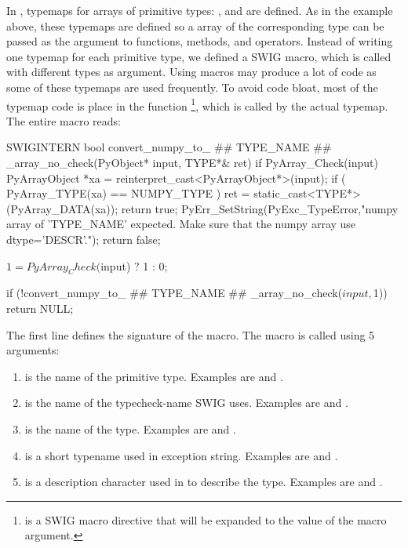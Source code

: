In , typemaps for arrays of primitive types:
,  and  are defined. 
As in the  example above, these typemaps are defined so a \numpy
array of the corresponding type can be passed as the argument to functions,
methods, and operators. 
Instead of writing one typemap for each primitive type, we defined a SWIG
macro, which is called with different types as argument. Using macros may
produce a lot of code as some of these typemaps are used frequently. To
avoid code bloat, most of the typemap code is place in the function
\-\-\footnote{ is a SWIG macro directive that will be expanded to the value of the  macro argument.}, which is called
by the actual typemap. The entire macro reads:
\begin{swigcode}
SWIGINTERN bool convert_numpy_to_ ## TYPE_NAME ## _array_no_check(PyObject* input, TYPE*& ret)
{
  if PyArray_Check(input)
  {
    PyArrayObject *xa = reinterpret_cast<PyArrayObject*>(input);
    if ( PyArray_TYPE(xa) == NUMPY_TYPE )
    {
      ret  = static_cast<TYPE*>(PyArray_DATA(xa));
      return true;
    }
  }
  PyErr_SetString(PyExc_TypeError,"numpy array of 'TYPE_NAME' expected. Make sure that the numpy array use dtype='DESCR'.");
  return false;
}

{
    $1 = PyArray_Check($input) ? 1 : 0;
}

{
if (!convert_numpy_to_ ## TYPE_NAME ## _array_no_check($input,$1))
    return NULL;
}

\end{swigcode}
The first line defines the signature of the macro. The macro is called using 5 arguments:
\begin{enumerate}
\item {} is the name of the primitive type. Examples are 
 and .
\item {} is the name of the typecheck-name SWIG uses. Examples
are  and .
\item {} is the name of the \numpy type. Examples are
 and .
\item {} is a short typename used in exception string.
Examples are  and .
\item {} is a description character used in \numpy to describe the
type. Examples are  and .
\end{enumerate}
